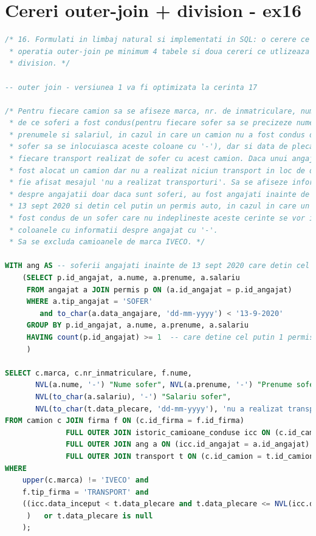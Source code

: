\documentclass[12pt, a4paper]{article}
\begin{document}
\section{Cereri outer-join + division - ex16}
\begin{lstlisting}[language=SQL]
/* 16. Formulati in limbaj natural si implementati in SQL: o cerere ce utilizeaza
 * operatia outer-join pe minimum 4 tabele si doua cereri ce utlizeaza operatia
 * division. */

-- outer join - versiunea 1 va fi optimizata la cerinta 17

/* Pentru fiecare camion sa se afiseze marca, nr. de inmatriculare, numele firmei,
 * de ce soferi a fost condus(pentru fiecare sofer sa se precizeze numele,
 * prenumele si salariul, in cazul in care un camion nu a fost condus de un
 * sofer sa se inlocuiasca aceste coloane cu '-'), dar si data de plecare pentru
 * fiecare transport realizat de sofer cu acest camion. Daca unui angajat i-a
 * fost alocat un camion dar nu a realizat niciun transport in loc de data sa
 * fie afisat mesajul 'nu a realizat transporturi'. Sa se afiseze informatiile
 * despre angajatii doar daca sunt soferi, au fost angajati inainte de data de
 * 13 sept 2020 si detin cel putin un permis auto, in cazul in care un camion a
 * fost condus de un sofer care nu indeplineste aceste cerinte se vor inlocui
 * coloanele cu informatii despre angajat cu '-'.
 * Sa se excluda camioanele de marca IVECO. */

WITH ang AS -- soferii angajati inainte de 13 sept 2020 care detin cel mult 2 permise auto
    (SELECT p.id_angajat, a.nume, a.prenume, a.salariu
     FROM angajat a JOIN permis p ON (a.id_angajat = p.id_angajat)
     WHERE a.tip_angajat = 'SOFER'
        and to_char(a.data_angajare, 'dd-mm-yyyy') < '13-9-2020'
     GROUP BY p.id_angajat, a.nume, a.prenume, a.salariu
     HAVING count(p.id_angajat) >= 1  -- care detine cel putin 1 permis
     )

SELECT c.marca, c.nr_inmatriculare, f.nume,
       NVL(a.nume, '-') "Nume sofer", NVL(a.prenume, '-') "Prenume sofer",
       NVL(to_char(a.salariu), '-') "Salariu sofer",
       NVL(to_char(t.data_plecare, 'dd-mm-yyyy'), 'nu a realizat transporturi') "Data transport"
FROM camion c JOIN firma f ON (c.id_firma = f.id_firma)
              FULL OUTER JOIN istoric_camioane_conduse icc ON (c.id_camion = icc.id_camion)
              FULL OUTER JOIN ang a ON (icc.id_angajat = a.id_angajat)
              FULL OUTER JOIN transport t ON (c.id_camion = t.id_camion)
WHERE
    upper(c.marca) != 'IVECO' and
    f.tip_firma = 'TRANSPORT' and
    ((icc.data_inceput < t.data_plecare and t.data_plecare <= NVL(icc.data_sfarsit, sysdate)
     )   or t.data_plecare is null
    );


\end{lstlisting}
\end{document}
